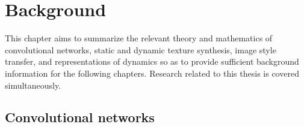 \chapter{Background}\label{chap:background}

This chapter aims to summarize the relevant theory and mathematics of
convolutional networks,
static and dynamic texture synthesis, image style transfer, and representations of dynamics so as to provide sufficient
background information for the following chapters. Research
related to this thesis is covered simultaneously.

\section{Convolutional networks}


